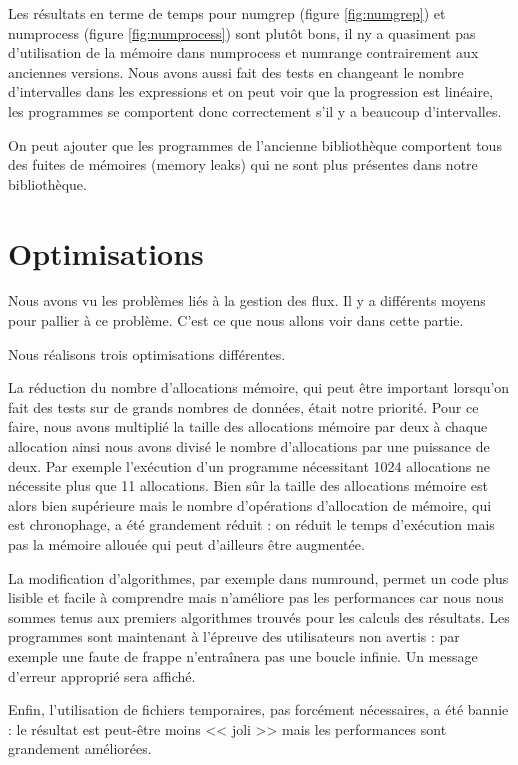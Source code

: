 Les r\'esultats en terme de temps pour numgrep (figure \ref{fig:numgrep}) et numprocess (figure \ref{fig:numprocess}) sont plut\^ot bons, il ny a quasiment pas d'utilisation de la m\'emoire dans numprocess et numrange contrairement aux anciennes versions. 
Nous avons aussi fait des tests en changeant le nombre d'intervalles dans les expressions et on peut voir que la progression est lin\'eaire, les programmes se comportent donc correctement s'il y a beaucoup d'intervalles.

On peut ajouter que les programmes de l'ancienne biblioth\`eque comportent tous des fuites de m\'emoires (memory leaks) qui ne sont plus pr\'esentes 
dans notre biblioth\`eque.

\section{Optimisations}

Nous avons vu les probl\`emes li\'es \`a la gestion des flux. Il y a diff\'erents moyens pour pallier \`a ce probl\`eme.
C'est ce que nous allons voir dans cette partie.

Nous r\'ealisons trois optimisations diff\'erentes.

La r\'eduction du nombre d'allocations m\'emoire, qui peut \^etre important lorsqu'on fait des tests sur de grands nombres de donn\'ees, \'etait notre priorit\'e.
Pour ce faire, nous avons multipli\'e la taille des allocations m\'emoire par deux \`a chaque allocation ainsi nous avons divis\'e le nombre d'allocations par une puissance de deux.
Par exemple l'ex\'ecution d'un programme n\'ecessitant 1024 allocations ne n\'ecessite plus que 11 allocations. Bien s\^ur la taille des allocations m\'emoire est alors bien 
sup\'erieure mais le nombre d'op\'erations d'allocation de m\'emoire, qui est chronophage, a \'et\'e grandement r\'eduit :
on r\'eduit le temps d'ex\'ecution mais pas la m\'emoire allou\'ee qui peut d'ailleurs \^etre augment\'ee.

La modification d'algorithmes, par exemple dans numround, permet un code plus lisible et facile \`a comprendre mais n'am\'eliore pas les performances car nous nous sommes tenus aux premiers algorithmes trouv\'es pour les calculs des r\'esultats.
Les programmes sont maintenant \`a l'\'epreuve des utilisateurs non avertis : par exemple une faute de frappe n'entra\^inera pas une boucle infinie. Un message d'erreur appropri\'e sera affich\'e.

Enfin, l'utilisation de fichiers temporaires, pas forc\'ement n\'ecessaires, a \'et\'e bannie : le r\'esultat est peut-\^etre moins << joli >> mais les performances sont grandement am\'elior\'ees.

